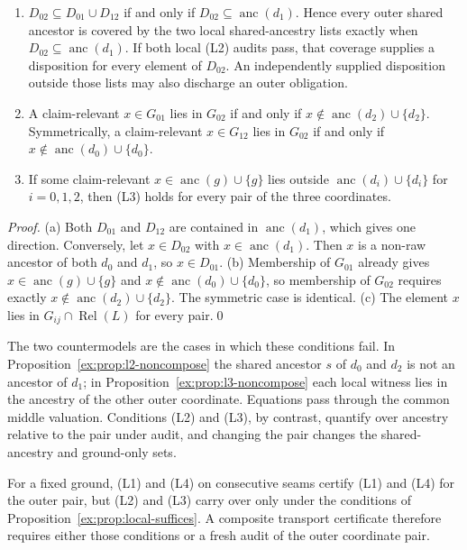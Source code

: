 \documentclass[twocolumn,envcountsect,envcountsame,natbib]{svjour3}
\begin{document}
\begin{proposition}\label{ex:prop:local-suffices}
\begin{enumerate}
\item[(a)] $D_{02}\subseteq D_{01}\cup D_{12}$ if and only if $D_{02}\subseteq\operatorname{anc}(d_1)$. Hence every outer shared ancestor is covered by the two local shared-ancestry lists exactly when $D_{02}\subseteq\operatorname{anc}(d_1)$. If both local (L2) audits pass, that coverage supplies a disposition for every element of $D_{02}$. An independently supplied disposition outside those lists may also discharge an outer obligation.
\item[(b)] A claim-relevant $x\in G_{01}$ lies in $G_{02}$ if and only if $x\notin\operatorname{anc}(d_2)\cup\{d_2\}$. Symmetrically, a claim-relevant $x\in G_{12}$ lies in $G_{02}$ if and only if $x\notin\operatorname{anc}(d_0)\cup\{d_0\}$.
\item[(c)] If some claim-relevant $x\in\operatorname{anc}(g)\cup\{g\}$ lies outside $\operatorname{anc}(d_i)\cup\{d_i\}$ for $i=0,1,2$, then (L3) holds for every pair of the three coordinates.
\end{enumerate}
\end{proposition}
\begin{proof}
(a) Both $D_{01}$ and $D_{12}$ are contained in $\operatorname{anc}(d_1)$, which gives one direction. Conversely, let $x\in D_{02}$ with $x\in\operatorname{anc}(d_1)$. Then $x$ is a non-raw ancestor of both $d_0$ and $d_1$, so $x\in D_{01}$. (b) Membership of $G_{01}$ already gives $x\in\operatorname{anc}(g)\cup\{g\}$ and $x\notin\operatorname{anc}(d_0)\cup\{d_0\}$, so membership of $G_{02}$ requires exactly $x\notin\operatorname{anc}(d_2)\cup\{d_2\}$. The symmetric case is identical. (c) The element $x$ lies in $G_{ij}\cap\operatorname{Rel}(L)$ for every pair.\qed
\end{proof}

The two countermodels are the cases in which these conditions fail. In Proposition~\ref{ex:prop:l2-noncompose} the shared ancestor $s$ of $d_0$ and $d_2$ is not an ancestor of $d_1$; in Proposition~\ref{ex:prop:l3-noncompose} each local witness lies in the ancestry of the other outer coordinate. Equations pass through the common middle valuation. Conditions (L2) and (L3), by contrast, quantify over ancestry relative to the pair under audit, and changing the pair changes the shared-ancestry and ground-only sets.

\begin{corollary}\label{ex:cor:fresh-outer-audit}
For a fixed ground, (L1) and (L4) on consecutive seams certify (L1) and (L4) for the outer pair, but (L2) and (L3) carry over only under the conditions of Proposition~\ref{ex:prop:local-suffices}. A composite transport certificate therefore requires either those conditions or a fresh audit of the outer coordinate pair.
\end{corollary}
\end{document}
